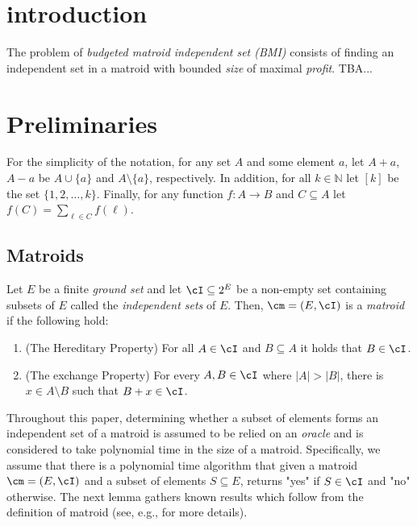 



\section{introduction}
\label{sec:introduction}

The problem of {\em budgeted matroid independent set (BMI)} consists of finding an independent set in a matroid with bounded {\em size} of maximal {\em profit}. TBA...

\section{Preliminaries}
\label{sec:preliminaries}

For the simplicity of the notation, for any set $A$ and some element $a$, let $A+a$, $A-a$ be $A \cup \{a\}$ and $A \setminus \{a\}$, respectively. In addition, for all $k \in \mathbb{N}$ let $[k]$ be the set $\{1,2,\ldots,k\}$. Finally, for any function $f:A \rightarrow B$ and $C \subseteq A$ let $f(C) = \sum_{\ell \in C} f(\ell)$. 

\subsection{Matroids}

Let $E$ be a finite {\em ground set} and let $\cI \subseteq 2^E$ be a non-empty set containing subsets of $E$ called the {\em independent sets} of $E$. Then, $\cm = (E, \cI)$ is a {\em matroid} if the following hold: 

\begin{enumerate}
	\item (The Hereditary Property) For all $A \in \cI$ and $B \subseteq A$ it holds that $B \in \cI$.
	
	\item(The exchange Property) For every $A,B \in \cI$ where $|A| > |B|$, there is $x \in A \setminus B$ such that $B +x \in \cI$. 
\end{enumerate}

Throughout this paper, determining whether a subset of elements forms an independent set of a matroid is assumed to be relied on an {\em oracle} and is considered to take polynomial time in the size of a matroid. Specifically, we assume that there is a polynomial time algorithm that given a matroid $\cm = (E, \cI)$ and a subset of elements $S \subseteq E$, returns "yes" if $S \in \cI$ and "no" otherwise. The next lemma gathers known results which follow from the definition of matroid (see, e.g., \cite{schrijver2003combinatorial} for more details). 


